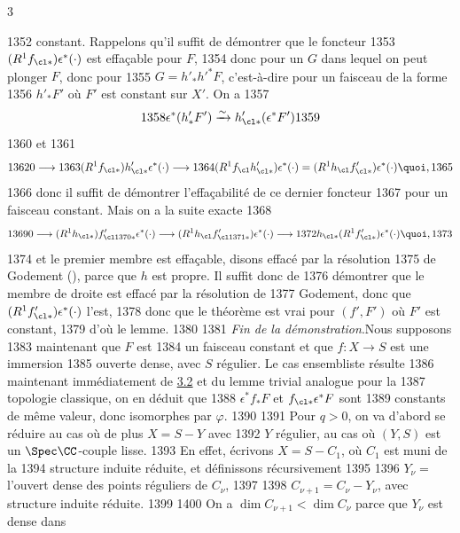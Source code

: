 3	\documentclass[10pt]{../fichiers-configuration-latex/smfart}
\begin{document}
  1352	constant. Rappelons qu'il suffit de démontrer que le foncteur
  1353	$(R^{1}f_{\cl \ast})\epsilon^{\ast}(\cdot)$ est effaçable pour $F$,
  1354	donc pour un $G$ dans lequel on peut plonger $F$, donc pour
  1355	$G={h'_\ast}{h'}^{\ast}F$, c'est-à-dire pour un faisceau de la forme
  1356	${h'_\ast}F'$ où $F'$ est constant sur $X'$. On a
  1357	$$
  1358	\epsilon^{\ast}({h'_\ast}F')\xrightarrow{\sim}h'_{\cl \ast}(\epsilon^{\ast}F')
  1359	$$
  1360	et
  1361	$$
  1362	0\longrightarrow
  1363	(R^{1}f_{\cl\ast})h'_{\cl\ast}\epsilon^{\ast}(\cdot)\longrightarrow
  1364	(R^{1}f_{\cl}h'_{\cl\ast})\epsilon^{\ast}(\cdot)=(R^{1}h_{\cl}f'_{\cl\ast})\epsilon^{\ast}(\cdot){\quoi},
  1365	$$
  1366	donc il suffit de démontrer l'effaçabilité de ce dernier foncteur
  1367	pour un faisceau constant. Mais on a la suite exacte
  1368	$$
  1369	0\longrightarrow (R^{1}h_{\cl \ast})f'_{\cl
  1370	\ast}\epsilon^{\ast}(\cdot)\longrightarrow (R^{1}h_{\cl}f'_{\cl
  1371	\ast})\epsilon^{\ast}(\cdot)\longrightarrow
  1372	h_{\cl\ast}(R^{1}f'_{\cl\ast})\epsilon^{\ast}(\cdot){\quoi},
  1373	$$
  1374	et le premier membre est effaçable, disons effacé par la résolution
  1375	de Godement (), parce que $h$ est propre. Il suffit donc de
  1376	démontrer que le membre de droite est effacé par la résolution de
  1377	Godement, donc que $(R^{1}f'_{\cl\ast})\epsilon^{\ast}(\cdot)$ l'est,
  1378	donc que le théorème est vrai pour $(f',F')$ où $F'$ est constant,
  1379	d'où le lemme.
  1380	
  1381		\emph{Fin de la démonstration}.\pageoriginale Nous supposons 
  1383	maintenant que $F$ est
  1384	un faisceau constant et que $f:X\rightarrow S$ est une immersion
  1385	ouverte dense, avec $S$ régulier. Le cas ensembliste résulte
  1386	maintenant immédiatement de \hyperref[XVI.prop3.2]{3.2} et du lemme trivial analogue pour la
  1387	topologie classique, on en déduit que
  1388	$\epsilon^{\ast}f_{\ast}F$ et $f_{\cl\ast}\epsilon^{\ast}F$ sont
  1389	constants de même valeur, donc isomorphes par $\varphi$.
  1390	
  1391	Pour $q>0$, on va d'abord se réduire au cas où de plus $X=S-Y$ avec
  1392	$Y$ régulier, \ie au cas où $(Y,S)$ est un $\Spec \CC$-couple lisse.
  1393	En effet, écrivons $X=S-C_1$, où $C_1$ est muni de la
  1394	structure induite réduite, et définissons récursivement
  1395	
  1396	$Y_{\nu}=$ l'ouvert dense des points réguliers de $C_{\nu}$,
  1397	
  1398	$C_{\nu +1}=C_{\nu}-Y_{\nu}$, avec structure induite réduite.
  1399	
  1400		On a $\dim C_{\nu+1}<\dim C_{\nu}$ parce que $Y_{\nu}$ est dense dans
\end{document}
